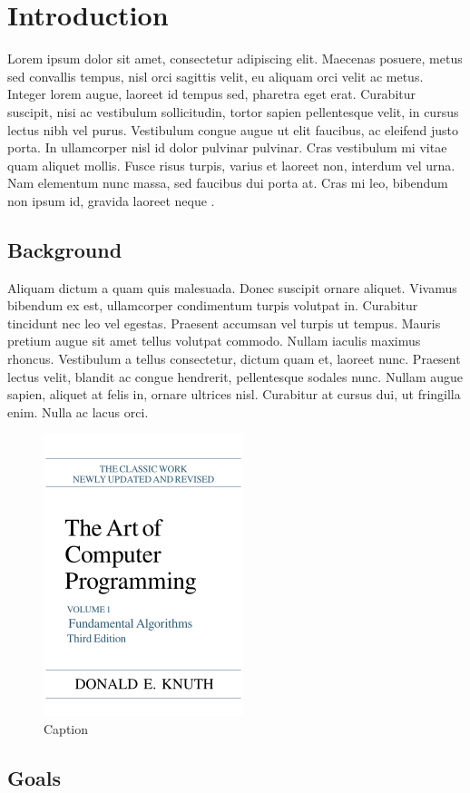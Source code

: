 \chapter{Introduction}

Lorem ipsum dolor sit amet, consectetur adipiscing elit. Maecenas posuere, metus sed convallis tempus, nisl orci sagittis velit, eu aliquam orci velit ac metus. Integer lorem augue, laoreet id tempus sed, pharetra eget erat. Curabitur suscipit, nisi ac vestibulum sollicitudin, tortor sapien pellentesque velit, in cursus lectus nibh vel purus. Vestibulum congue augue ut elit faucibus, ac eleifend justo porta. In ullamcorper nisl id dolor pulvinar pulvinar. Cras vestibulum mi vitae quam aliquet mollis. Fusce risus turpis, varius et laoreet non, interdum vel urna. Nam elementum nunc massa, sed faucibus dui porta at. Cras mi leo, bibendum non ipsum id, gravida laoreet neque \cite{knuth1997art}.

\section{Background}

Aliquam dictum a quam quis malesuada. Donec suscipit ornare aliquet. Vivamus bibendum ex est, ullamcorper condimentum turpis volutpat in. Curabitur tincidunt nec leo vel egestas. Praesent accumsan vel turpis ut tempus. Mauris pretium augue sit amet tellus volutpat commodo. Nullam iaculis maximus rhoncus. Vestibulum a tellus consectetur, dictum quam et, laoreet nunc. Praesent lectus velit, blandit ac congue hendrerit, pellentesque sodales nunc. Nullam augue sapien, aliquet at felis in, ornare ultrices nisl. Curabitur at cursus dui, ut fringilla enim. Nulla ac lacus orci.

\begin{figure}
    \centering
    \includegraphics[width=0.2\linewidth]{img/chapter1/ArtOfComputerProgramming.png}
    \caption{Caption}
    \label{fig:book-1}
\end{figure}

\section{Goals}

